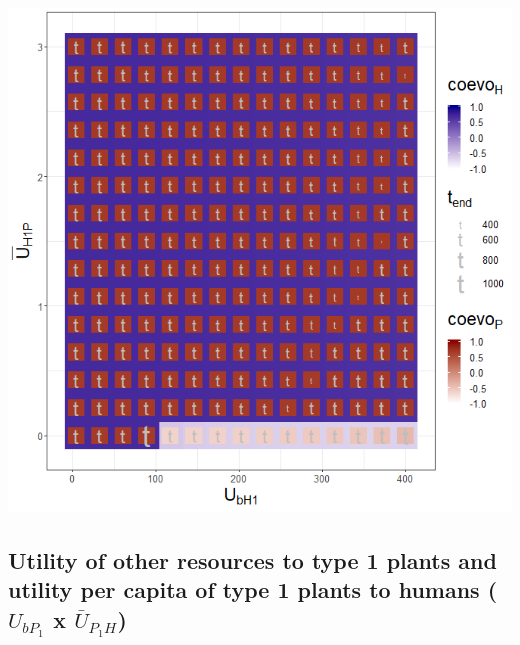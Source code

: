 \documentclass[
]{book}
\begin{document}

\includegraphics[width=1\linewidth]{plots/3_twoPar-U.bH1-mU.H1P_plot}

\newpage

\hypertarget{utility-of-other-resources-to-type-1-plants-and-utility-per-capita-of-type-1-plants-to-humans-u_bp_1-x-baru_p_1h}{%
\subsection{\texorpdfstring{Utility of other resources to type 1 plants and utility per capita of type 1 plants to humans (\(U_{bP_{1}}\) x \(\bar{U}_{P_{1}H}\))}{Utility of other resources to type 1 plants and utility per capita of type 1 plants to humans (U\_\{bP\_\{1\}\} x \textbackslash bar\{U\}\_\{P\_\{1\}H\})}}\label{utility-of-other-resources-to-type-1-plants-and-utility-per-capita-of-type-1-plants-to-humans-u_bp_1-x-baru_p_1h}}
\end{document}
